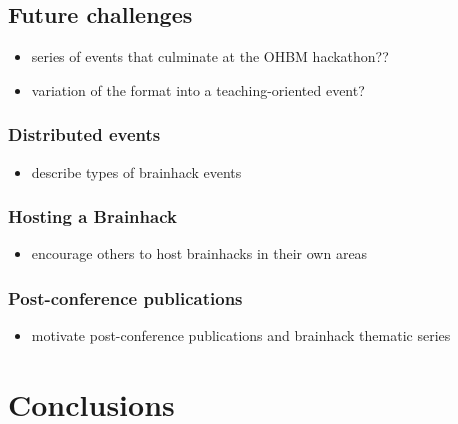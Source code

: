 \documentclass[11pt]{bmc_article_s50}
\providecommand{\tightlist}{%
  \setlength{\itemsep}{0pt}\setlength{\parskip}{0pt}}
\begin{document}
\subsection{Future challenges}\label{future-challenges}

\begin{itemize}
\tightlist
\item
  series of events that culminate at the OHBM hackathon??
  
\item
  variation of the format into a teaching-oriented event?
\end{itemize}

\subsubsection{Distributed events}\label{distributed-events}

\begin{itemize}
\tightlist
\item
  describe types of brainhack events
\end{itemize}

\subsubsection{Hosting a Brainhack}\label{hosting-a-brainhack}

\begin{itemize}
\tightlist
\item
  encourage others to host brainhacks in their own areas
\end{itemize}

\subsubsection{Post-conference
publications}\label{post-conference-publications}

\begin{itemize}
\tightlist
\item
  motivate post-conference publications and brainhack thematic series
\end{itemize}

\section{Conclusions}\label{conclusions}





\end{document}
